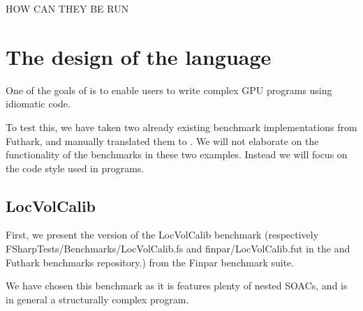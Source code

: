 HOW CAN THEY BE RUN



\section{The design of the \fshark{} language}
\label{sec:fsharklanguageeval}
One of the goals of \fshark{} is to enable users to write complex GPU programs
using idiomatic \fsharp{} code.

To test this, we have taken two already existing benchmark implementations from
Futhark, and manually translated them to \fshark{}.
We will not elaborate on the functionality of the benchmarks in these two
examples. Instead we will focus on the code style used in \fshark{} programs.

\subsection{LocVolCalib}
\label{subsec:locvolcalib}
First, we present the \fshark{} version of the LocVolCalib benchmark (respectively
FSharpTests/Benchmarks/LocVolCalib.fs and finpar/LocVolCalib.fut in the
\fshark{} and Futhark benchmarks repository.) from the Finpar\cite{finpar}
benchmark suite.

We have chosen this benchmark as it is features plenty of nested SOACs, and is
in general a structurally complex program.

